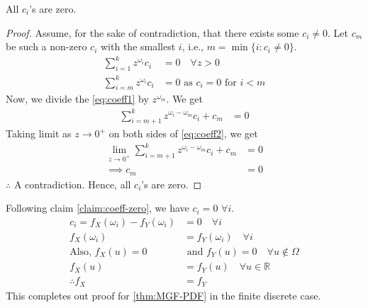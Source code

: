 \begin{claim}\label{claim:coeff-zero}
	All $c_i$'s are zero.
\end{claim}
\begin{proof}
	Assume, for the sake of contradiction, that there exists some $c_i \neq 0$. Let $c_m$ be such a non-zero $c_i$ with the smallest $i$, i.e., $m = \min\{i: c_i \neq 0\}$.
	\begin{align}
		\sum_{i=1}^k z^{\omega_i} c_i & = 0   \hspace{1em} \forall z > 0            \nonumber           \\
		\sum_{i=m}^k z^{\omega_i} c_i & = 0\textrm{ as } c_i = 0 \textrm{ for } i < m \label{eq:coeff1}
	\end{align}
	Now, we divide the \cref{eq:coeff1} by $z^{\omega_m}$. We get
	\begin{align}
		\sum_{i=m+1}^k z^{\omega_i - \omega_m} c_i + c_m & = 0\label{eq:coeff2}
	\end{align}
	Taking limit as $z \to 0^+$ on both sides of \cref{eq:coeff2}, we get
	\begin{align*}
		\lim_{z\to 0^+} \sum_{i=m+1}^k z^{\omega_i - \omega_m} c_i + c_m & = 0 \\
		\implies c_m                                                     & = 0
	\end{align*}
	$\therefore$ A contradiction. Hence, all $c_i$'s are zero.
\end{proof}
Following claim \ref{claim:coeff-zero}, we have $c_i = 0$ $\forall i$.
\begin{align*}
	c_i = f_X(\omega_i) - f_Y(\omega_i) & = 0 \hspace{1em} \forall i                                   \\
	f_X(\omega_i)                       & = f_Y(\omega_i) \hspace{1em} \forall i                       \\
	\textrm{Also, }	f_X(u) = 0          & \textrm{ and } f_Y(u)=0 \hspace{1em} \forall u \notin \Omega \\
	f_X(u)                              & = f_Y(u) \hspace{1em}\forall u\in \mathbb{R}                 \\
	\therefore	f_X                      & = f_Y
\end{align*}
This completes out proof for \cref{thm:MGF-PDF} in the finite discrete case.
